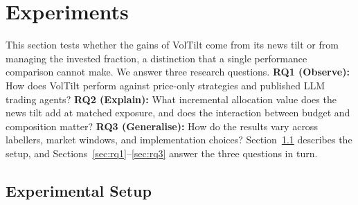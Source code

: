 \providecommand{\est}[1]{#1}
\section{Experiments}
\label{sec:experiments}
\setlength{\textfloatsep}{12pt plus 2pt minus 2pt}\setlength{\floatsep}{10pt plus 2pt minus 2pt}\setlength{\intextsep}{10pt plus 2pt minus 2pt}

This section tests whether the gains of VolTilt come from its news tilt or from managing the invested fraction, a distinction that a single performance comparison cannot make. We answer three research questions. \textbf{RQ1 (Observe):} How does VolTilt perform against price-only strategies and published LLM trading agents? \textbf{RQ2 (Explain):} What incremental allocation value does the news tilt add at matched exposure, and does the interaction between budget and composition matter? \textbf{RQ3 (Generalise):} How do the results vary across labellers, market windows, and implementation choices? Section~\ref{sec:exp-setup} describes the setup, and Sections~\ref{sec:rq1}--\ref{sec:rq3} answer the three questions in turn.

\subsection{Experimental Setup}
\label{sec:exp-setup}

